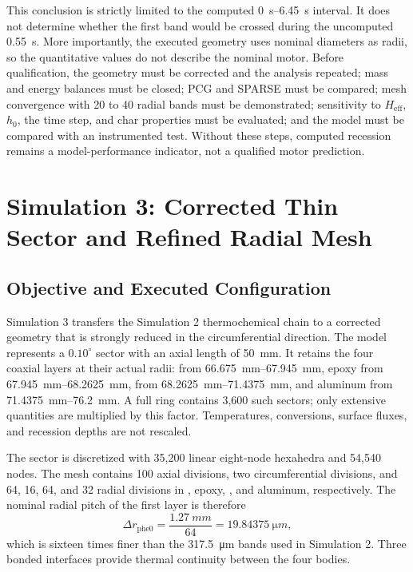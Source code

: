 \documentclass[oneside,openany]{amsdtx}
\begin{document}
This conclusion is strictly limited to the computed
\SIrange{0}{6.45}{s} interval. It does not determine whether the first band
would be crossed during the uncomputed \SI{0.55}{s}. More importantly, the
executed geometry uses nominal diameters as radii, so the quantitative values
do not describe the nominal motor. Before qualification, the geometry must be
corrected and the analysis repeated; mass and energy balances must be closed;
PCG and SPARSE must be compared; mesh convergence with 20 to 40 radial bands
must be demonstrated; sensitivity to \(H_\mathrm{eff}\), \(h_0\), the time
step, and char properties must be evaluated; and the model must be compared
with an instrumented test. Without these steps, computed recession remains a
model-performance indicator, not a qualified motor prediction.

\clearpage
\section{Simulation 3: Corrected Thin Sector and Refined Radial Mesh}

\subsection{Objective and Executed Configuration}

Simulation 3 transfers the Simulation 2 thermochemical chain to a corrected
geometry that is strongly reduced in the circumferential direction. The model
represents a \(0.10^\circ\) sector with an axial length of \SI{50}{mm}. It
retains the four coaxial layers at their actual radii:  from
\SIrange{66.675}{67.945}{mm}, epoxy from
\SIrange{67.945}{68.2625}{mm},  from
\SIrange{68.2625}{71.4375}{mm}, and aluminum from
\SIrange{71.4375}{76.2}{mm}. A full ring contains 3,600 such sectors; only
extensive quantities are multiplied by this factor. Temperatures,
conversions, surface fluxes, and recession depths are not rescaled.

The sector is discretized with 35,200 linear eight-node hexahedra and 54,540
nodes. The mesh contains 100 axial divisions, two circumferential divisions,
and 64, 16, 64, and 32 radial divisions in , epoxy, ,
and aluminum, respectively. The nominal radial pitch of the first layer is
therefore
\[
  \Delta r_\mathrm{phe0}=\frac{\SI{1.27}{mm}}{64}
  =\SI{19.84375}{\micro m},
\]
which is sixteen times finer than the \SI{317.5}{\micro m} bands used in
Simulation 2. Three bonded interfaces provide thermal continuity between the
four bodies.
\end{document}
